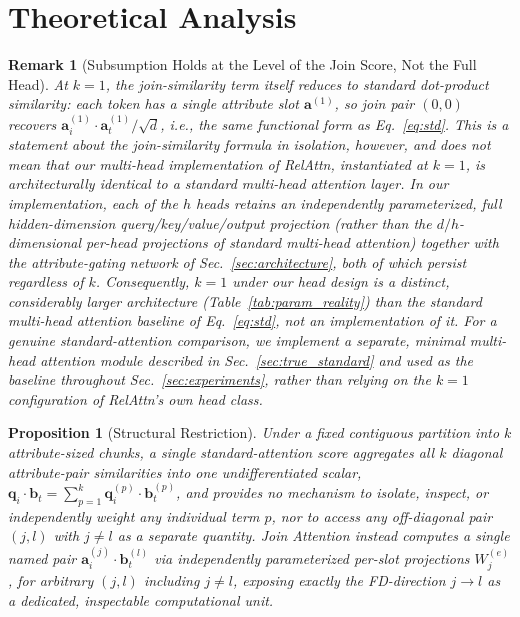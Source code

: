 \documentclass[review]{elsarticle}
\newtheorem{proposition}[theorem]{Proposition}
\newtheorem{remark}[theorem]{Remark}
\begin{document}
\section{Theoretical Analysis}
\label{sec:theory}

\begin{remark}[Subsumption Holds at the Level of the Join Score, Not the Full Head]
\label{rem:subsumption}
At $k=1$, the join-similarity term itself reduces to standard dot-product similarity: each token has a single attribute slot $\mathbf{a}^{(1)}$, so join pair $(0,0)$ recovers $\mathbf{a}^{(1)}_i \cdot \mathbf{a}^{(1)}_t / \sqrt{d}$, i.e., the same functional form as Eq.~\eqref{eq:std}. This is a statement about the join-similarity formula in isolation, however, and does \emph{not} mean that our multi-head implementation of RelAttn, instantiated at $k{=}1$, is architecturally identical to a standard multi-head attention layer. In our implementation, each of the $h$ heads retains an independently parameterized, full hidden-dimension query/key/value/output projection (rather than the $d/h$-dimensional per-head projections of standard multi-head attention) together with the attribute-gating network of Sec.~\ref{sec:architecture}, both of which persist regardless of $k$. Consequently, $k{=}1$ under our head design is a distinct, considerably larger architecture (Table~\ref{tab:param_reality}) than the standard multi-head attention baseline of Eq.~\eqref{eq:std}, not an implementation of it. For a genuine standard-attention comparison, we implement a separate, minimal multi-head attention module described in Sec.~\ref{sec:true_standard} and used as the baseline throughout Sec.~\ref{sec:experiments}, rather than relying on the $k{=}1$ configuration of RelAttn's own head class.
\end{remark}

\begin{proposition}[Structural Restriction] \label{prop:interference}
Under a fixed contiguous partition into $k$ attribute-sized chunks, a single standard-attention score aggregates all $k$ diagonal attribute-pair similarities into one undifferentiated scalar, $\mathbf{q}_i \cdot \mathbf{b}_t = \sum_{p=1}^{k} \mathbf{q}_i^{(p)} \cdot \mathbf{b}_t^{(p)}$, and provides no mechanism to isolate, inspect, or independently weight any individual term $p$, nor to access any off-diagonal pair $(j,l)$ with $j \neq l$ as a separate quantity. Join Attention instead computes a single named pair $\mathbf{a}_i^{(j)} \cdot \mathbf{b}_t^{(l)}$ via independently parameterized per-slot projections $W_j^{(e)}$, for arbitrary $(j,l)$ including $j \neq l$, exposing exactly the FD-direction $j \to l$ as a dedicated, inspectable computational unit.
\end{proposition}
\end{document}

